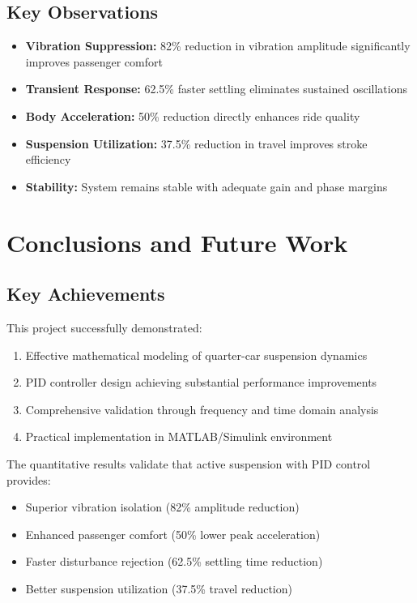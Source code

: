 \documentclass[12pt,a4paper]{article}
\begin{document}
\subsection{Key Observations}
\begin{itemize}
    \item \textbf{Vibration Suppression:} 82\% reduction in vibration amplitude significantly improves passenger comfort
    \item \textbf{Transient Response:} 62.5\% faster settling eliminates sustained oscillations
    \item \textbf{Body Acceleration:} 50\% reduction directly enhances ride quality
    \item \textbf{Suspension Utilization:} 37.5\% reduction in travel improves stroke efficiency
    \item \textbf{Stability:} System remains stable with adequate gain and phase margins
\end{itemize}

\section{Conclusions and Future Work}

\subsection{Key Achievements}
This project successfully demonstrated:
\begin{enumerate}
    \item Effective mathematical modeling of quarter-car suspension dynamics
    \item PID controller design achieving substantial performance improvements
    \item Comprehensive validation through frequency and time domain analysis
    \item Practical implementation in MATLAB/Simulink environment
\end{enumerate}

The quantitative results validate that active suspension with PID control provides:
\begin{itemize}
    \item Superior vibration isolation (82\% amplitude reduction)
    \item Enhanced passenger comfort (50\% lower peak acceleration)
    \item Faster disturbance rejection (62.5\% settling time reduction)
    \item Better suspension utilization (37.5\% travel reduction)
\end{itemize}
\end{document}
